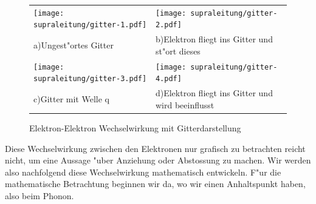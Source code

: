 \begin{refsection}
\begin{figure}
\centering
  \begin{tabular}{l l}
  \centering
    \begin{minipage}{0.48\textwidth}
	\texttt{[image: supraleitung/gitter-1.pdf]}
    \end{minipage}
    &
    \begin{minipage}{0.48\textwidth}
	\texttt{[image: supraleitung/gitter-2.pdf]}	
    \end{minipage}
    \\
    a)\quad Ungest"ortes Gitter
    &
    b)\quad Elektron fliegt ins Gitter und st"ort dieses
    \\
    \begin{minipage}{0.48\textwidth}
	\texttt{[image: supraleitung/gitter-3.pdf]}
    \end{minipage}
    &
    \begin{minipage}{0.48\textwidth}
	\texttt{[image: supraleitung/gitter-4.pdf]}
    \end{minipage}
    \\
    c)\quad Gitter mit Welle q
    &
    d)\quad Elektron fliegt ins Gitter und wird beeinflusst
    \\
  \end{tabular}
  \caption{Elektron-Elektron Wechselwirkung mit Gitterdarstellung
  \label{supraleitung:Gitter}}
\end{figure}

Diese Wechselwirkung zwischen den Elektronen nur grafisch zu betrachten reicht nicht,
um eine Aussage "uber Anziehung oder Abstossung zu machen.
Wir werden also nachfolgend diese Wechselwirkung mathematisch entwickeln.
F"ur die mathematische Betrachtung beginnen wir da, wo wir einen Anhaltspunkt haben, also beim Phonon.


\end{refsection}
